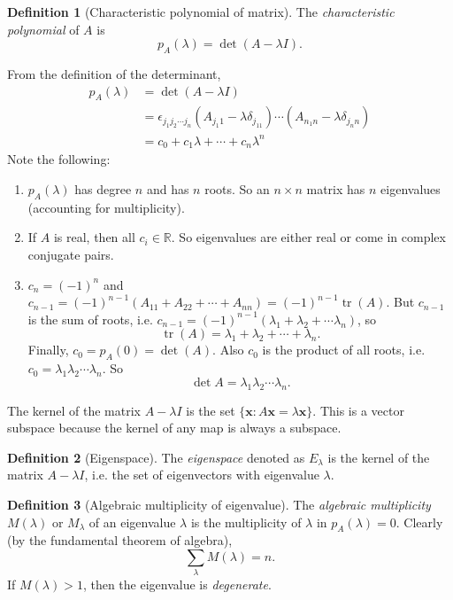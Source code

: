 \documentclass[a4paper]{article}
\theoremstyle{definition}
\newtheorem*{defi}{Definition}
\newcommand{\mb}[1]{\mathbf{#1}}
\newcommand{\R}{\mathbb{R}}
\DeclareMathOperator\tr{tr}
\begin{document}
\begin{defi}[Characteristic polynomial of matrix]
  The \emph{characteristic polynomial} of $A$ is
  \[
  p_A(\lambda) = \det(A - \lambda I).
  \]
\end{defi}

From the definition of the determinant,
\begin{align*}
  p_A(\lambda) &= \det(A - \lambda I)\\
  &= \epsilon_{j_1j_2\cdots j_n} (A_{j_1 1} - \lambda\delta_{j_11})\cdots (A_{n_1 n} - \lambda\delta_{j_nn})\\
  &= c_0 + c_1\lambda + \cdots + c_n\lambda^n
\end{align*}
Note the following:
\begin{enumerate}
\item $p_A(\lambda)$ has degree $n$ and has $n$ roots. So an $n\times n$ matrix has $n$ eigenvalues (accounting for multiplicity).
\item If $A$ is real, then all $c_i\in \R$. So eigenvalues are either real or come in complex conjugate pairs.
\item $c_n = (-1)^n$ and $c_{n - 1} = (-1)^{n - 1}(A_{11} + A_{22} + \cdots + A_{nn}) = (-1)^{n - 1}\tr(A)$. But $c_{n -1}$ is the sum of roots, i.e. $c_{n - 1}= (-1)^{n - 1}(\lambda_1 + \lambda_2 + \cdots \lambda_n)$, so
\[
\tr(A) = \lambda_1 + \lambda_2 + \cdots + \lambda_n.
\]
Finally, $c_0 = p_A(0) = \det(A)$. Also $c_0$ is the product of all roots, i.e. $c_0 = \lambda_1\lambda_2\cdots \lambda_n$. So
\[
\det A = \lambda_1\lambda_2\cdots \lambda_n.
\]
\end{enumerate}

The kernel of the matrix $A - \lambda I$ is the set $\{\mb{x}: A\mb{x} = \lambda\mb{x}\}$. This is a vector subspace because the kernel of any map is always a subspace.

\begin{defi}[Eigenspace]
  The \emph{eigenspace} denoted as $E_\lambda$ is the kernel of the matrix $A - \lambda I$, i.e. the set of eigenvectors with eigenvalue $\lambda$.
\end{defi}

\begin{defi}[Algebraic multiplicity of eigenvalue]
  The \emph{algebraic multiplicity} $M(\lambda)$ or $M_\lambda$ of an eigenvalue $\lambda$ is the multiplicity of $\lambda$ in $p_A(\lambda) = 0$. Clearly (by the fundamental theorem of algebra),
  \[
  \sum_\lambda M(\lambda) = n.
  \]
  If $M(\lambda) > 1$, then the eigenvalue is \emph{degenerate}.
\end{defi}
\end{document}
